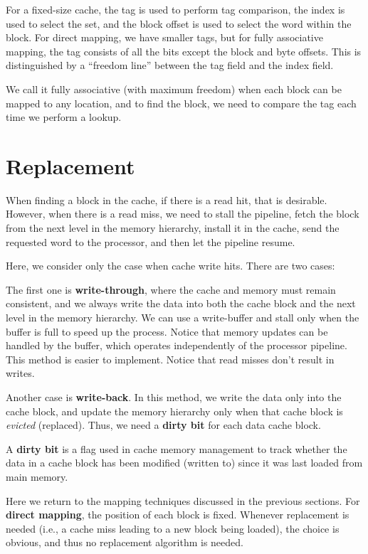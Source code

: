 For a fixed-size cache, the tag is used to perform tag comparison, the index is used to select the set, and the block offset is used to select the word within the block. For direct mapping, we have smaller tags, but for fully associative mapping, the tag consists of all the bits except the block and byte offsets. This is distinguished by a ``freedom line'' between the tag field and the index field.

We call it fully associative (with maximum freedom) when each block can be mapped to any location, and to find the block, we need to compare the tag each time we perform a lookup.

\section{Replacement}
When finding a block in the cache, if there is a read hit, that is desirable. However, when there is a read miss, we need to stall the pipeline, fetch the block from the next level in the memory hierarchy, install it in the cache, send the requested word to the processor, and then let the pipeline resume.

Here, we consider only the case when cache write hits. There are two cases:

The first one is \textbf{write-through}, where the cache and memory must remain consistent, and we always write the data into both the cache block and the next level in the memory hierarchy. We can use a write-buffer and stall only when the buffer is full to speed up the process. Notice that memory updates can be handled by the buffer, which operates independently of the processor pipeline. This method is easier to implement. Notice that read misses don't result in writes. 

Another case is \textbf{write-back}. In this method, we write the data only into the cache block, and update the memory hierarchy only when that cache block is \textit{evicted} (replaced). Thus, we need a \textbf{dirty bit} for each data cache block.

\begin{remark}
  A \textbf{dirty bit} is a flag used in cache memory management to track whether the data in a cache block has been modified (written to) since it was last loaded from main memory.
\end{remark}

Here we return to the mapping techniques discussed in the previous sections. For \textbf{direct mapping}, the position of each block is fixed. Whenever replacement is needed (i.e., a cache miss leading to a new block being loaded), the choice is obvious, and thus no replacement algorithm is needed.

